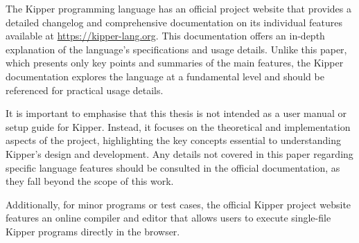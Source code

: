 The Kipper programming language has an official project website that provides a detailed changelog and comprehensive documentation on its individual features available at \url{https://kipper-lang.org}. This documentation offers an in-depth explanation of the language’s specifications and usage details. Unlike this paper, which presents only key points and summaries of the main features, the Kipper documentation explores the language at a fundamental level and should be referenced for practical usage details.

It is important to emphasise that this thesis is not intended as a user manual or setup guide for Kipper. Instead, it focuses on the theoretical and implementation aspects of the project, highlighting the key concepts essential to understanding Kipper’s design and development. Any details not covered in this paper regarding specific language features should be consulted in the official documentation, as they fall beyond the scope of this work.

Additionally, for minor programs or test cases, the official Kipper project website features an online compiler and editor that allows users to execute single-file Kipper programs directly in the browser.

